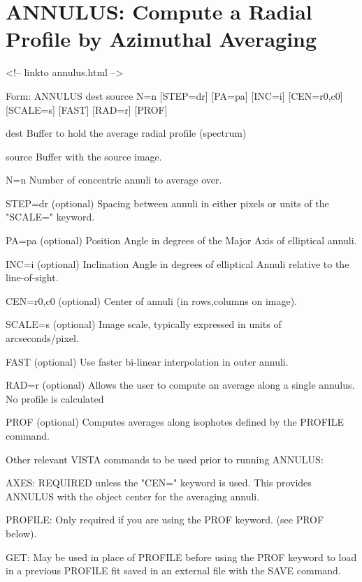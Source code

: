 \section{ANNULUS: Compute a Radial Profile by Azimuthal Averaging}
\begin{rawhtml}
<!-- linkto annulus.html -->
\end{rawhtml}
\begin{command}
  \item[Form: ANNULUS dest source N=n {[STEP=dr]} {[PA=pa]} {[INC=i]} 
       {[CEN=r0,c0]} {[SCALE=s]} {[FAST]} {[RAD=r]} {[PROF]}\hfill]{}
  \item[dest]{Buffer to hold the average radial profile (spectrum)}
  \item[source]{Buffer with the source image.}
  \item[N=n]{Number of concentric annuli to average over.}
  \item[STEP=dr]{(optional) Spacing between annuli in either pixels or
       units of the "SCALE=" keyword.}
  \item[PA=pa]{(optional) Position Angle in degrees of the Major Axis 
       of elliptical annuli.}
  \item[INC=i]{(optional) Inclination Angle in degrees of elliptical 
       Annuli relative to the line-of-sight.}
  \item[CEN=r0,c0]{(optional) Center of annuli (in rows,columns on image).}
  \item[SCALE=s]{(optional) Image scale, typically expressed in units
       of arcseconds/pixel.}
  \item[FAST]{(optional) Use faster bi-linear interpolation in outer annuli.}
  \item[RAD=r]{(optional) Allows the user to compute an average along
       a single annulus.  No profile is calculated}
  \item[PROF]{(optional) Computes averages along isophotes defined by
       the PROFILE command.}
\end{command}

Other relevant VISTA commands to be used prior to running ANNULUS:
\begin{hanging}
  \item{AXES: REQUIRED unless the "CEN=" keyword is used.  This provides
        ANNULUS with the object center for the averaging annuli. }

  \item{PROFILE: Only required if you are using the PROF keyword. (see PROF
        below).}

  \item{GET: May be used in place of PROFILE before using the PROF keyword
        to load in a previous PROFILE fit saved in an external file with
        the SAVE command. }
\end{hanging}
 
